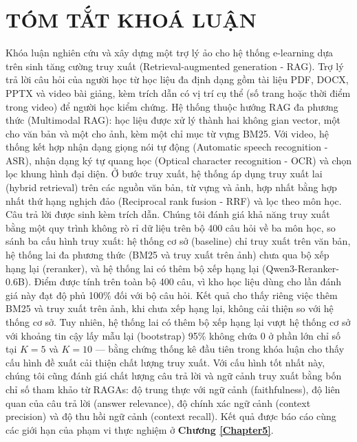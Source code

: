 \chapter*{TÓM TẮT KHOÁ LUẬN}

Khóa luận nghiên cứu và xây dựng một trợ lý ảo cho hệ thống e-learning dựa trên sinh tăng cường truy xuất (Retrieval-augmented generation - RAG). Trợ lý trả lời câu hỏi của người học từ học liệu đa định dạng gồm tài liệu PDF, DOCX, PPTX và video bài giảng, kèm trích dẫn có vị trí cụ thể (số trang hoặc thời điểm trong video) để người học kiểm chứng.
\bigbreak\noindent
Hệ thống thuộc hướng RAG đa phương thức (Multimodal RAG): học liệu được xử lý thành hai không gian vector, một cho văn bản và một cho ảnh, kèm một chỉ mục từ vựng BM25. Với video, hệ thống kết hợp nhận dạng giọng nói tự động (Automatic speech recognition - ASR), nhận dạng ký tự quang học (Optical character recognition - OCR) và chọn lọc khung hình đại diện. Ở bước truy xuất, hệ thống áp dụng truy xuất lai (hybrid retrieval) trên các nguồn văn bản, từ vựng và ảnh, hợp nhất bằng hợp nhất thứ hạng nghịch đảo (Reciprocal rank fusion - RRF) và lọc theo môn học. Câu trả lời được sinh kèm trích dẫn.
\bigbreak\noindent
Chúng tôi đánh giá khả năng truy xuất bằng một quy trình không rò rỉ dữ liệu trên bộ 400 câu hỏi về ba môn học, so sánh ba cấu hình truy xuất: hệ thống cơ sở (baseline) chỉ truy xuất trên văn bản, hệ thống lai đa phương thức (BM25 và truy xuất trên ảnh) chưa qua bộ xếp hạng lại (reranker), và hệ thống lai có thêm bộ xếp hạng lại (Qwen3-Reranker-0.6B). Điểm được tính trên toàn bộ 400 câu, vì kho học liệu dùng cho lần đánh giá này đạt độ phủ 100\% đối với bộ câu hỏi. Kết quả cho thấy riêng việc thêm BM25 và truy xuất trên ảnh, khi chưa xếp hạng lại, không cải thiện so với hệ thống cơ sở. Tuy nhiên, hệ thống lai có thêm bộ xếp hạng lại vượt hệ thống cơ sở với khoảng tin cậy lấy mẫu lại (bootstrap) 95\% không chứa 0 ở phần lớn chỉ số tại $K = 5$ và $K = 10$ — bằng chứng thống kê đầu tiên trong khóa luận cho thấy cấu hình đề xuất cải thiện chất lượng truy xuất. Với cấu hình tốt nhất này, chúng tôi cũng đánh giá chất lượng câu trả lời và ngữ cảnh truy xuất bằng bốn chỉ số tham khảo từ RAGAs: độ trung thực với ngữ cảnh (faithfulness), độ liên quan của câu trả lời (answer relevance), độ chính xác ngữ cảnh (context precision) và độ thu hồi ngữ cảnh (context recall). Kết quả được báo cáo cùng các giới hạn của phạm vi thực nghiệm ở \textbf{Chương \ref{Chapter5}}.
